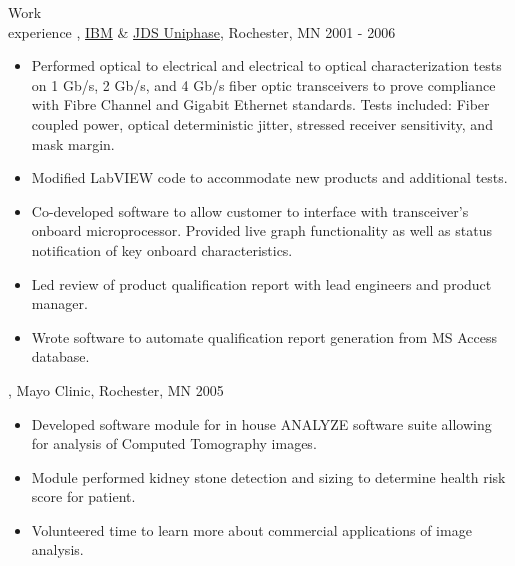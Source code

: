 \begin{category}{Work \\experience}
, \href{http://www.ibm.com}{IBM} \& \href{http://www.jdsu.com}{JDS Uniphase}, Rochester, MN  2001 - 2006 
\begin{itemize}
\item Performed optical to electrical and electrical to optical characterization tests on 1 Gb/s, 2 Gb/s, and 4 Gb/s fiber optic transceivers to prove compliance with Fibre Channel and Gigabit Ethernet standards. Tests included: Fiber coupled power, optical deterministic jitter, stressed receiver sensitivity, and mask margin.
\item Modified LabVIEW code to accommodate new products and additional tests.
\item Co-developed software to allow customer to interface with transceiver's onboard microprocessor. Provided live graph functionality as well as status notification of key onboard characteristics.
\item Led review of product qualification report with lead engineers and product manager.
\item Wrote software to automate qualification report generation from MS Access database.
\end{itemize}


, Mayo Clinic, Rochester, MN  2005 
\begin{itemize}
\item Developed software module for in house ANALYZE software suite allowing for analysis of Computed Tomography images. 
\item Module performed kidney stone detection and sizing to determine health risk score for patient.
\item Volunteered time to learn more about commercial applications of image analysis. 
\end{itemize}



\end{category}
